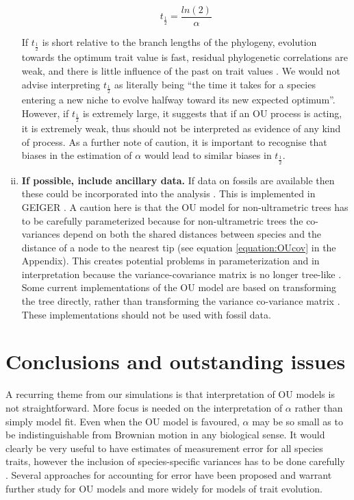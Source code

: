 \documentclass[a4paper,12pt]{article}
\begin{document}
\begin{enumerate}[(i)]
      \begin{equation}
        t_\frac{1}{2} = \frac{ln(2)}{\alpha}
        \label{equation:halflife}
      \end{equation}
    
    \noindent
    If $t_\frac{1}{2}$ is short relative to the branch lengths of the phylogeny, evolution towards the optimum trait value is fast, residual phylogenetic correlations are weak, and there is little influence of the past on trait values \citep{hansen1997stabilizing}.
    We would not advise interpreting $t_\frac{1}{2}$ as literally being ``the time it takes for a species entering a new niche to evolve halfway toward its new expected optimum''.
    However, if $t_\frac{1}{2}$ is extremely large, it suggests that if an OU process is acting, it is extremely weak, thus should not be interpreted as evidence of any kind of process. 
    As a further note of caution, it is important to recognise that biases in the estimation of $\alpha$ would lead to similar biases in $t_\frac{1}{2}$.
  
    \item \textbf{If possible, include ancillary data.}
    If data on fossils are available then these could be incorporated into the analysis \citep{Slater:2012ab}.
    This is implemented in GEIGER \citep{Harmon:2008aa}.
    A caution here is that the OU model for non-ultrametric trees has to be carefully parameterized because for non-ultrametric trees the co-variances depend on both the shared distances between species and the distance of a node to the nearest tip (see equation \ref{equation:OUcov} in the Appendix). 
    This creates potential problems in parameterization and in interpretation because the variance-covariance matrix is no longer tree-like \citep{slater2014correction}.
    Some current implementations of the OU model are based on transforming the tree directly, rather than transforming the variance co-variance matrix \citep[e.g., MOTMOT;][]{Thomas:2011aa}. 
    These implementations should not be used with fossil data.
   \end{enumerate}  
    
\section{Conclusions and outstanding issues}
  A recurring theme from our simulations is that interpretation of OU models is not straightforward. More focus is needed on the interpretation of $\alpha$ rather than simply model fit. Even when the OU model is favoured, $\alpha$ may be so small as to be indistinguishable from Brownian motion in any biological sense. It would clearly be very useful to have estimates of measurement error for all species traits, however the inclusion of species-specific variances has to be done carefully \citep[e.g.,][]{grafen1989phylogenetic}. Several approaches for accounting for error have been proposed and warrant further study for OU models and more widely for models of trait evolution. %
\end{document}
